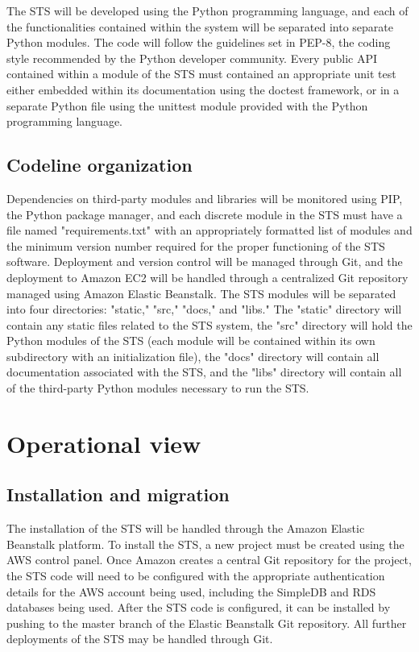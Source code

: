 \documentclass[a4paper,11pt]{report}
\begin{document}
The STS will be developed using the Python programming language, and each of
the functionalities contained within the system will be separated into separate
Python modules. The code will follow the guidelines set in PEP-8, the coding
style recommended by the Python developer community. Every public API contained
within a module of the STS must contained an appropriate unit test either
embedded within its documentation using the doctest framework, or in a separate
Python file using the unittest module provided with the Python programming
language.

\subsection{Codeline organization}
\label{sec:codel-organ}

Dependencies on third-party modules and libraries will be monitored using PIP,
the Python package manager, and each discrete module in the STS must have a
file named "requirements.txt" with an appropriately formatted list of modules
and the minimum version number required for the proper functioning of the STS
software. Deployment and version control will be managed through Git, and the
deployment to Amazon EC2 will be handled through a centralized Git repository
managed using Amazon Elastic Beanstalk. The STS modules will be separated into
four directories: "static," "src," "docs," and "libs." The "static" directory
will contain any static files related to the STS system, the "src" directory
will hold the Python modules of the STS (each module will be contained within
its own subdirectory with an initialization file), the "docs" directory will
contain all documentation associated with the STS, and the "libs" directory
will contain all of the third-party Python modules necessary to run the STS.

\section{Operational view}
\label{sec:operational-view}


\subsection{Installation and migration}
\label{sec:inst-migr}


The installation of the STS will be handled through the Amazon Elastic Beanstalk
platform. To install the STS, a new project must be created using the AWS
control panel. Once Amazon creates a central Git repository for the project, the
STS code will need to be configured with the appropriate authentication details
for the AWS account being used, including the SimpleDB and RDS databases being
used. After the STS code is configured, it can be installed by pushing to the
master branch of the Elastic Beanstalk Git repository. All further deployments
of the STS may be handled through Git.
\end{document}
